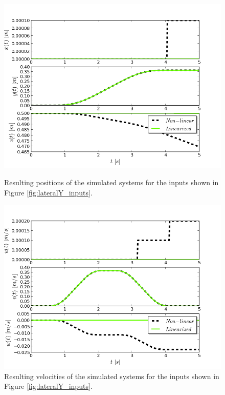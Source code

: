\begin{figure}[h!]
\centering
\includegraphics[scale=0.7]{Images/Chapter3/Lateral_Y/Positions.png}
\caption{Resulting positions of the simulated systems for the inputs shown in Figure \ref{fig:lateralY_inputs}.}
\label{fig:LateralY_positions}

\includegraphics[scale=0.7]{Images/Chapter3/Lateral_Y/Linear_velocities.png}
\caption{Resulting velocities of the simulated systems for the inputs shown in Figure \ref{fig:lateralY_inputs}.}
\label{fig:LateralY_velocities}
\end{figure}

